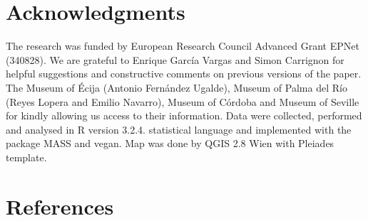 \documentclass[review]{elsarticle}
\begin{document}
\section{Acknowledgments}

The research was funded by European Research Council Advanced Grant EPNet (340828). We are grateful to Enrique Garc\'ia Vargas and Simon Carrignon for helpful suggestions and constructive comments on previous versions of the paper. The Museum of \'Ecija (Antonio Fern\'andez Ugalde), Museum of Palma del R\'io (Reyes Lopera and Emilio Navarro), Museum of C\'ordoba and Museum of Seville for kindly allowing us access to their information.  
Data were collected, performed and analysed in R version 3.2.4. statistical language and implemented with the package MASS and vegan. Map was done by QGIS 2.8 Wien with Pleiades template. 


\section*{References}


\end{document}
